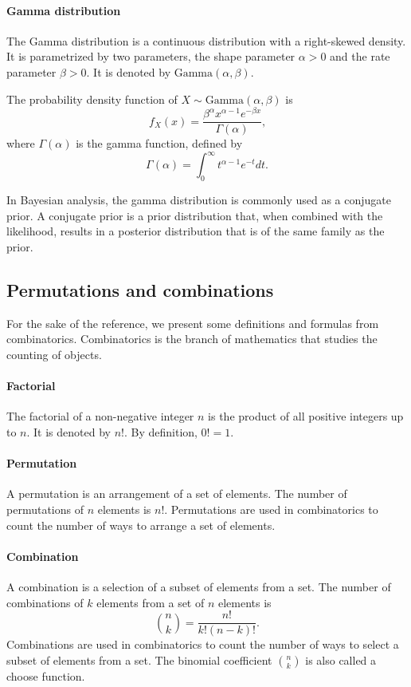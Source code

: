 \paragraph{Gamma distribution} The Gamma distribution is a continuous distribution with a
right-skewed density.  It is parametrized by two parameters, the shape parameter $\alpha
> 0$ and the rate parameter $\beta > 0$.  It is denoted by $\text{Gamma}(\alpha, \beta)$.

The probability density function of $X \sim \text{Gamma}(\alpha, \beta)$ is
\begin{equation}
  \label{eq:gamma}
  f_X(x) = \frac{\beta^\alpha x^{\alpha - 1} e^{-\beta x}}{\Gamma(\alpha)}\text{,}
\end{equation}
where $\Gamma(\alpha)$ is the gamma function, defined by
\begin{equation}
  \label{eq:gammaf}
  \Gamma(\alpha) = \int_0^\infty t^{\alpha - 1} e^{-t} dt\text{.}
\end{equation}

In Bayesian analysis, the gamma distribution is commonly used as a conjugate prior.
A conjugate prior is a prior distribution that, when combined with the likelihood,
results in a posterior distribution that is of the same family as the prior.

\subsection{Permutations and combinations}

For the sake of the reference, we present some definitions and formulas from
combinatorics. Combinatorics is the branch of mathematics that studies the counting of
objects.

\paragraph{Factorial}  The factorial of a non-negative integer $n$ is the product of all
positive integers up to $n$.  It is denoted by $n!$.  By definition, $0! = 1$.

\paragraph{Permutation}  A permutation is an arrangement of a set of elements.  The
number of permutations of $n$ elements is $n!$.  Permutations are used in combinatorics
to count the number of ways to arrange a set of elements.

\paragraph{Combination}  A combination is a selection of a subset of elements from a set.
The number of combinations of $k$ elements from a set of $n$ elements is $$\binom{n}{k} =
\frac{n!}{k!(n - k)!}\text{.}$$  Combinations are used in combinatorics to count the
number of ways to select a subset of elements from a set.  The binomial coefficient
$\binom{n}{k}$ is also called a choose function.

